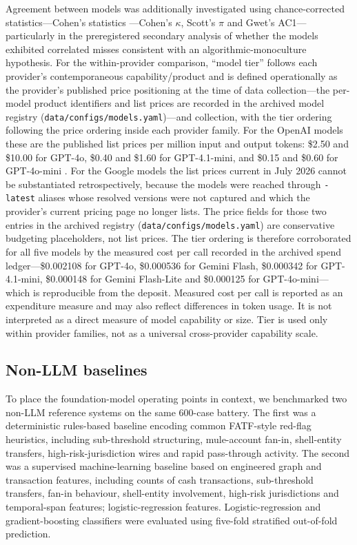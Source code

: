 \documentclass[pdflatex,sn-basic,Numbered]{sn-jnl}
\newcommand{\HLtext}[1]{\texthl{#1}}
\newcommand{\HLdel}[1]{\textcolor{HLink}{\sout{#1}}}
\renewcommand{\HLtext}[1]{#1}\renewcommand{\HLdel}[1]{#1}%
\begin{document}
Agreement between models was additionally investigated using chance-corrected \HLdel{statistics---Cohen's} \HLtext{statistics} \cite{gwet}\HLtext{---Cohen's} $\kappa$, Scott's $\pi$ and Gwet's \HLtext{AC1---particularly} in the preregistered secondary analysis of whether the models exhibited correlated misses consistent with an algorithmic-monoculture hypothesis. For the within-provider comparison, ``model tier'' \HLdel{follows each provider's contemporaneous capability/product and} \HLtext{is defined operationally as the provider's published} price positioning at the time of data \HLdel{collection---the per-model product identifiers and list prices are recorded in the archived model registry (\texttt{data/configs/models.yaml})---and} \HLtext{collection, with the tier ordering following the price ordering inside each provider family. For the OpenAI models these are the published list prices per million input and output tokens:} \$\HLtext{2.50 and} \$\HLtext{10.00 for GPT-4o,} \$\HLtext{0.40 and} \$\HLtext{1.60 for GPT-4.1-mini, and} \$\HLtext{0.15 and} \$\HLtext{0.60 for GPT-4o-mini} \cite{openai-pricing}\HLtext{. For the Google models the list prices current in July 2026 cannot be substantiated retrospectively, because the models were reached through} \texttt{-latest} \HLtext{aliases whose resolved versions were not captured and which the provider's current pricing page no longer lists. The price fields for those two entries in the archived registry (}\texttt{data/configs/models.yaml}\HLtext{) are conservative budgeting placeholders, not list prices. The tier ordering is therefore corroborated for all five models by the measured cost per call recorded in the archived spend ledger---}\$\HLtext{0.002108 for GPT-4o,} \$\HLtext{0.000536 for Gemini Flash,} \$\HLtext{0.000342 for GPT-4.1-mini,} \$\HLtext{0.000148 for Gemini Flash-Lite and} \$\HLtext{0.000125 for GPT-4o-mini---which is reproducible from the deposit. Measured cost per call is reported as an expenditure measure and may also reflect differences in token usage. It is not interpreted as a direct measure of model capability or size. Tier} is used only within provider families, not as a universal cross-provider capability scale.

\subsection{Non-LLM baselines}

To place the foundation-model operating points in context, we benchmarked two non-LLM reference systems on the same 600-case battery. The first was a deterministic rules-based baseline encoding common FATF-style red-flag heuristics, including sub-threshold structuring, mule-account fan-in, shell-entity transfers, high-risk-jurisdiction wires and rapid pass-through activity. The second was a supervised machine-learning baseline based on engineered graph and transaction features, including counts of cash transactions, sub-threshold transfers, fan-in behaviour, shell-entity involvement, high-risk jurisdictions and temporal-span \HLdel{features; logistic-regression} \HLtext{features. Logistic-regression} and gradient-boosting classifiers were evaluated using five-fold stratified out-of-fold prediction.
\end{document}

